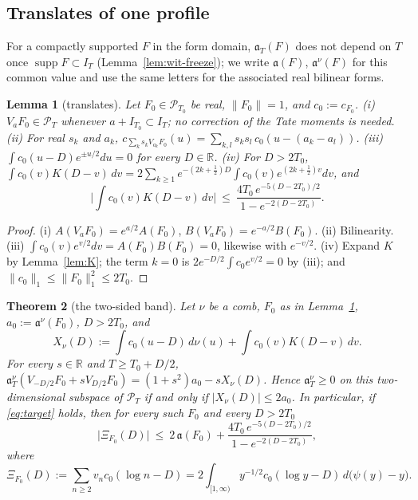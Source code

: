 \documentclass[11pt]{amsart}
\newtheorem{theorem}{Theorem}[section]
\newtheorem{lemma}[theorem]{Lemma}
\theoremstyle{definition}
\theoremstyle{remark}
\newcommand{\R}{\mathbb R}
\newcommand{\supp}{\operatorname{supp}}
\newcommand{\PT}{\mathcal P_T}
\newcommand{\IT}{I_T}
\begin{document}
\subsection{Translates of one profile}\label{subsec:translates}
For a compactly supported $F$ in the form domain, $\mathfrak a_T(F)$ does not depend on $T$ once $\supp F\subset\IT$
(Lemma~\ref{lem:wit-freeze}); we write $\mathfrak a(F)$, $\mathfrak a^\nu(F)$ for this common value and use the same letters for the
associated real bilinear forms.

\begin{lemma}[translates]\label{lem:transl}
Let $F_0\in\mathcal P_{T_0}$ be real, $\|F_0\|=1$, and $c_0:=c_{F_0}$.
\emph{(i)} $V_aF_0\in\PT$ whenever $a+I_{T_0}\subset\IT$; no correction of the Tate moments is needed.
\emph{(ii)} For real $s_k$ and $a_k$, $c_{\sum_ks_kV_{a_k}F_0}(u)=\sum_{k,l}s_ks_l\,c_0(u-(a_k-a_l))$.
\emph{(iii)} $\int c_0(u-D)e^{\pm u/2}du=0$ for every $D\in\R$.
\emph{(iv)} For $D>2T_0$, $\int c_0(v)K(D-v)\,dv=2\sum_{k\ge1}e^{-(2k+\frac12)D}\int c_0(v)e^{(2k+\frac12)v}dv$, and
\[
\Big|\int c_0(v)K(D-v)\,dv\Big|\ \le\ \frac{4T_0\,e^{-5(D-2T_0)/2}}{1-e^{-2(D-2T_0)}} .
\]
\end{lemma}

\begin{proof}
(i) $A(V_aF_0)=e^{a/2}A(F_0)$, $B(V_aF_0)=e^{-a/2}B(F_0)$. (ii) Bilinearity. (iii) $\int c_0(v)e^{v/2}dv=A(F_0)B(F_0)=0$, likewise with
$e^{-v/2}$. (iv) Expand $K$ by Lemma~\ref{lem:K}; the term $k=0$ is $2e^{-D/2}\int c_0e^{v/2}=0$ by (iii); and
$\|c_0\|_1\le\|F_0\|_1^2\le2T_0$.
\end{proof}

\begin{theorem}[the two-sided band]\label{thm:band}
Let $\nu$ be a comb, $F_0$ as in Lemma~\ref{lem:transl}, $a_0:=\mathfrak a^\nu(F_0)$, $D>2T_0$, and
\[
X_\nu(D):=\int c_0(u-D)\,d\nu(u)+\int c_0(v)K(D-v)\,dv .
\]
For every $s\in\R$ and $T\ge T_0+D/2$, $\mathfrak a^\nu_T(V_{-D/2}F_0+sV_{D/2}F_0)=(1+s^2)a_0-sX_\nu(D)$. Hence $\mathfrak a^\nu_T\ge0$ on this
two-dimensional subspace of $\PT$ if and only if $|X_\nu(D)|\le2a_0$. In particular, if \eqref{eq:target} holds, then for every such
$F_0$ and every $D>2T_0$
\[
\big|\Xi_{F_0}(D)\big|\ \le\ 2\,\mathfrak a(F_0)+\frac{4T_0\,e^{-5(D-2T_0)/2}}{1-e^{-2(D-2T_0)}},
\]
where
\[
\Xi_{F_0}(D):=\sum_{n\ge2}v_nc_0(\log n-D)=2\int_{[1,\infty)}y^{-1/2}c_0(\log y-D)\,d\big(\psi(y)-y\big).
\]
\end{theorem}
\end{document}
